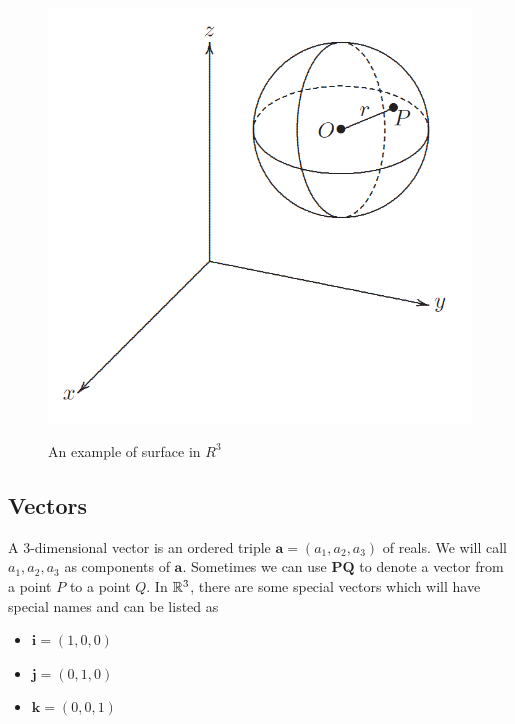 \documentclass[12pt]{article}
\begin{document}
\begin{center}
  \begin{figure}[h]
    \centering
    \includegraphics[width=\linewidth/3]{figures/fig3.png}
    \label{fig:3}
    \caption{An example of surface in $R^3$}
  \end{figure}
\end{center}

\subsection{Vectors}

A $3$-dimensional vector is an ordered triple $\pmb{a} = (a_1, a_2, a_3)$ of reals.
We will call $a_1, a_2, a_3$ as components of $\pmb{a}$. Sometimes we can use $\pmb{PQ}$
to denote a vector from a point $P$ to a point $Q$. In $\mathbb{R}^3$, there are some special
vectors which will have special names and can be listed as
\begin{itemize}
  \item $\pmb{i} = (1,0,0)$
  \item $\pmb{j} = (0,1,0)$
  \item $\pmb{k} = (0,0,1)$
\end{itemize}
\end{document}
